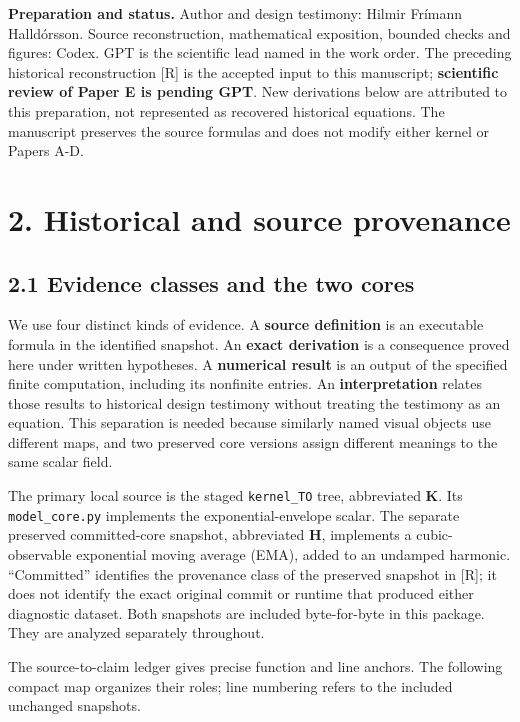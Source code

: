 \documentclass[
  11pt,
  a4paper,
]{article}
\begin{document}
\textbf{Preparation and status.} Author and design testimony: Hilmir Frímann Halldórsson. Source reconstruction, mathematical exposition, bounded checks and figures: Codex. GPT is the scientific lead named in the work order. The preceding historical reconstruction {[}R{]} is the accepted input to this manuscript; \textbf{scientific review of Paper E is pending GPT}. New derivations below are attributed to this preparation, not represented as recovered historical equations. The manuscript preserves the source formulas and does not modify either kernel or Papers A-D.

\section{2. Historical and source provenance}\label{historical-and-source-provenance}

\subsection{2.1 Evidence classes and the two cores}\label{evidence-classes-and-the-two-cores}

We use four distinct kinds of evidence. A \textbf{source definition} is an executable formula in the identified snapshot. An \textbf{exact derivation} is a consequence proved here under written hypotheses. A \textbf{numerical result} is an output of the specified finite computation, including its nonfinite entries. An \textbf{interpretation} relates those results to historical design testimony without treating the testimony as an equation. This separation is needed because similarly named visual objects use different maps, and two preserved core versions assign different meanings to the same scalar field.

The primary local source is the staged \texttt{kernel\_TO} tree, abbreviated \textbf{K}. Its \texttt{model\_core.py} implements the exponential-envelope scalar. The separate preserved committed-core snapshot, abbreviated \textbf{H}, implements a cubic-observable exponential moving average (EMA), added to an undamped harmonic. ``Committed'' identifies the provenance class of the preserved snapshot in {[}R{]}; it does not identify the exact original commit or runtime that produced either diagnostic dataset. Both snapshots are included byte-for-byte in this package. They are analyzed separately throughout.

The source-to-claim ledger gives precise function and line anchors. The following compact map organizes their roles; line numbering refers to the included unchanged snapshots.
\end{document}
